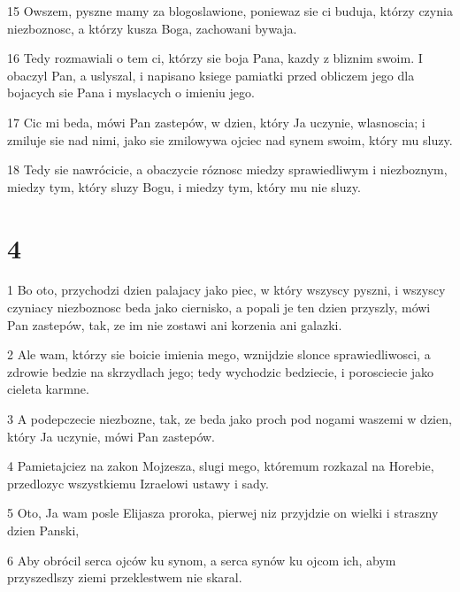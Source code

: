 \par 15 Owszem, pyszne mamy za blogoslawione, poniewaz sie ci buduja, którzy czynia niezboznosc, a którzy kusza Boga, zachowani bywaja.
\par 16 Tedy rozmawiali o tem ci, którzy sie boja Pana, kazdy z bliznim swoim. I obaczyl Pan, a uslyszal, i napisano ksiege pamiatki przed obliczem jego dla bojacych sie Pana i myslacych o imieniu jego.
\par 17 Cic mi beda, mówi Pan zastepów, w dzien, który Ja uczynie, wlasnoscia; i zmiluje sie nad nimi, jako sie zmilowywa ojciec nad synem swoim, który mu sluzy.
\par 18 Tedy sie nawrócicie, a obaczycie róznosc miedzy sprawiedliwym i niezboznym, miedzy tym, który sluzy Bogu, i miedzy tym, który mu nie sluzy.

\chapter{4}

\par 1 Bo oto, przychodzi dzien palajacy jako piec, w który wszyscy pyszni, i wszyscy czyniacy niezboznosc beda jako ciernisko, a popali je ten dzien przyszly, mówi Pan zastepów, tak, ze im nie zostawi ani korzenia ani galazki.
\par 2 Ale wam, którzy sie boicie imienia mego, wznijdzie slonce sprawiedliwosci, a zdrowie bedzie na skrzydlach jego; tedy wychodzic bedziecie, i porosciecie jako cieleta karmne.
\par 3 A podepczecie niezbozne, tak, ze beda jako proch pod nogami waszemi w dzien, który Ja uczynie, mówi Pan zastepów.
\par 4 Pamietajciez na zakon Mojzesza, slugi mego, któremum rozkazal na Horebie, przedlozyc wszystkiemu Izraelowi ustawy i sady.
\par 5 Oto, Ja wam posle Elijasza proroka, pierwej niz przyjdzie on wielki i straszny dzien Panski,
\par 6 Aby obrócil serca ojców ku synom, a serca synów ku ojcom ich, abym przyszedlszy ziemi przeklestwem nie skaral.


